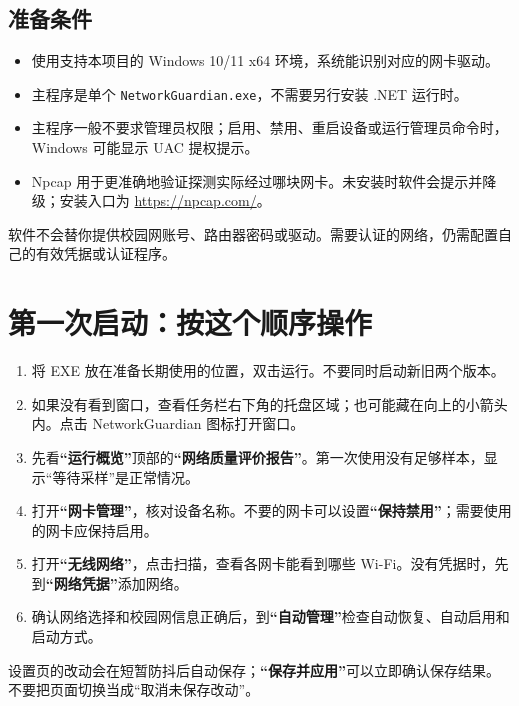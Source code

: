 \documentclass[UTF8,fontset=fandol,11pt,a4paper]{ctexart}
\newcommand{\ui}[1]{\textbf{“#1”}}
\newcommand{\tool}[1]{\nolinkurl{#1}}
\begin{document}
\subsection{准备条件}
\begin{itemize}
\item 使用支持本项目的 Windows 10/11 x64 环境，系统能识别对应的网卡驱动。
\item 主程序是单个 \tool{NetworkGuardian.exe}，不需要另行安装 .NET 运行时。
\item 主程序一般不要求管理员权限；启用、禁用、重启设备或运行管理员命令时，Windows 可能显示 UAC 提权提示。
\item Npcap 用于更准确地验证探测实际经过哪块网卡。未安装时软件会提示并降级；安装入口为 \url{https://npcap.com/}。
\end{itemize}
软件不会替你提供校园网账号、路由器密码或驱动。需要认证的网络，仍需配置自己的有效凭据或认证程序。

\section{第一次启动：按这个顺序操作}
\begin{enumerate}
\item 将 EXE 放在准备长期使用的位置，双击运行。不要同时启动新旧两个版本。
\item 如果没有看到窗口，查看任务栏右下角的托盘区域；也可能藏在向上的小箭头内。点击 NetworkGuardian 图标打开窗口。
\item 先看\ui{运行概览}顶部的\ui{网络质量评价报告}。第一次使用没有足够样本，显示“等待采样”是正常情况。
\item 打开\ui{网卡管理}，核对设备名称。不要的网卡可以设置\ui{保持禁用}；需要使用的网卡应保持启用。
\item 打开\ui{无线网络}，点击扫描，查看各网卡能看到哪些 Wi-Fi。没有凭据时，先到\ui{网络凭据}添加网络。
\item 确认网络选择和校园网信息正确后，到\ui{自动管理}检查自动恢复、自动启用和启动方式。
\end{enumerate}

设置页的改动会在短暂防抖后自动保存；\ui{保存并应用}可以立即确认保存结果。不要把页面切换当成“取消未保存改动”。
\end{document}
